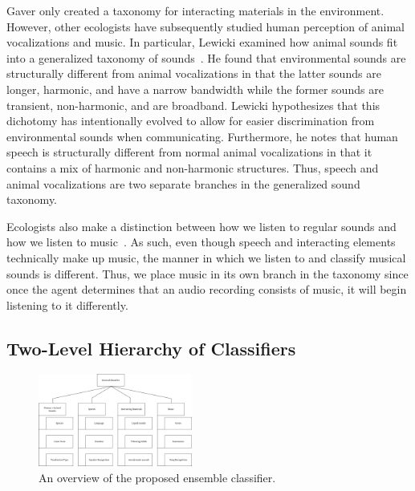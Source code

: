 Gaver only created a taxonomy for interacting materials in the environment.
%
However, other ecologists have subsequently studied human perception of animal
vocalizations and music.
%
In particular, Lewicki examined how animal sounds fit into a generalized
taxonomy of sounds~\cite{lewicki-efficient-2002}.
%
He found that environmental sounds are structurally different from animal
vocalizations in that the latter sounds are longer, harmonic, and have a narrow
bandwidth while the former sounds are transient, non-harmonic, and are
broadband.
%
Lewicki hypothesizes that this dichotomy has intentionally evolved to allow for
easier discrimination from environmental sounds when communicating.
%
Furthermore, he notes that human speech is structurally different from 
normal animal vocalizations in that it contains a mix of harmonic and
non-harmonic structures.
%
Thus, speech and animal vocalizations are two separate branches in the
generalized sound taxonomy.


Ecologists also make a distinction between how we listen to regular sounds  
and how we listen to music~.
%
As such, even though speech and interacting elements technically make up music,
the manner in which we listen to and classify musical sounds is different. 
%
Thus, we place music in its own branch in the taxonomy since once the agent
determines that an audio recording consists of music, it will begin listening 
to it differently.


\subsection{Two-Level Hierarchy of Classifiers}
\label{sec:classification-hierarchy}

\begin{figure}[h!]
    \centering
    \includegraphics[width=0.45\textwidth]{figures/ensemble-overview.png}
    \caption{An overview of the proposed ensemble classifier.}
    \label{fig:classifier-hierarchy}
\end{figure}

